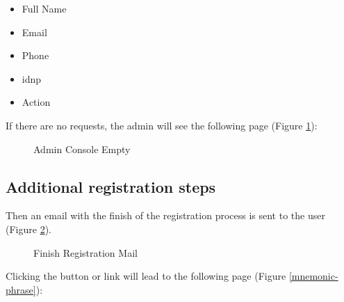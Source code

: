 \begin{itemize}
    \item Full Name
    \item Email
    \item Phone
    \item idnp
    \item Action
\end{itemize}

If there are no requests, the admin will see the following page (Figure \ref{admin-console-empty}):

\begin{figure}[H]
    \centering
    \caption{Admin Console Empty}
    \label{admin-console-empty}
\end{figure}

\subsection{Additional registration steps}

Then an email with the finish of the registration process is sent to the user (Figure \ref{finish-registration-mail}).

\begin{figure}[H]
    \centering
    \caption{Finish Registration Mail}
    \label{finish-registration-mail}
\end{figure}

Clicking the button or link will lead to the following page (Figure \ref{mnemonic-phrase}):

